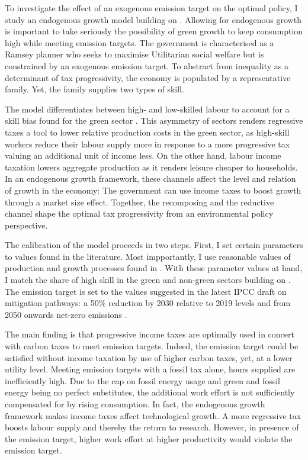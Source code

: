 To investigate the effect of an exogenous emission target on the optimal policy, I study an endogenous growth model building on \cite{Fried2018ClimateAnalysis}. Allowing for endogenous growth is important to take seriously the possibility of green growth to keep consumption high while meeting emission targets. The government is characterised as a Ramsey planner who seeks to maximise Utilitarian social welfare but is constrained by an exogenous emission target. To abstract from inequality as a determinant of tax progressivity, the economy is populated by a representative family. Yet, the family supplies two types of skill. 

The model differentiates between high- and low-skilled labour to account for a skill bias found for the green sector \citep{Consoli2016DoCapital}. This asymmetry of sectors renders regressive taxes a tool to lower relative production costs in the green sector, as high-skill workers reduce their labour supply more in response to a more progressive tax valuing an additional unit of income less. %
On the other hand, labour income taxation lowers aggregate production as it renders leisure cheaper to households. 
In an endogenous growth framework, these channels affect the level and relation of growth in the economy: The government can use income taxes to boost growth through a market size effect. Together, the recomposing and the reductive channel shape the optimal tax progressivity from an environmental policy perspective. 

The calibration of the model proceeds in two steps. First, I set certain parameters to values found in the literature. Most impportantly, I use reasonable values of production and growth processes found in \cite{Fried2018ClimateAnalysis}. %
With these parameter values at hand, I match the share of high skill in the green and non-green sectors building on \cite{Consoli2016DoCapital}. The emission target is set to the values suggested in the latest IPCC draft on mitigation pathways: a 50\% reduction by 2030 relative to 2019 levels and from 2050 onwards net-zero emissions \citep{IPCC2022}.

The main finding is that progressive income taxes are optimally used in concert with carbon taxes to meet emission targets. Indeed, the emission target could be satisfied without income taxation by use of higher carbon taxes, yet, at a lower utility level.  
Meeting emission targets with a fossil tax alone, hours supplied are inefficiently high. Due to the cap on fossil energy usage and green and fossil energy being no perfect substitutes, the additional work effort is not sufficiently compensated for by rising consumption.  
In fact, the endogenous growth framework makes income taxes affect technological growth. A more regressive tax boosts labour supply and thereby the return to research. However, in presence of the emission target, higher work effort at higher productivity would violate the emission target. 

